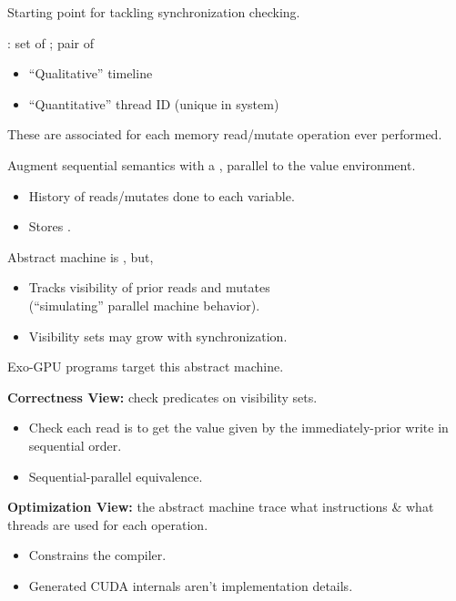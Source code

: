 \newpage
{}

{\LARGE
Starting point for tackling synchronization checking.

\vspace{5mm}

: set of ; pair of
\begin{itemize}
  \item ``Qualitative'' timeline
  \item ``Quantitative'' thread ID (unique in system)
\end{itemize}

\vspace{5mm}

These are associated for each memory read/mutate operation ever performed.

}


\newpage
{}

{\LARGE

Augment sequential semantics with a , parallel to the value environment.
\begin{itemize}
  \item History of reads/mutates done to each variable.
  \item Stores .
\end{itemize}

\vspace{5mm}

Abstract machine is , but,
\begin{itemize}
  \item Tracks visibility of prior reads and mutates\\(``simulating'' parallel machine behavior).
  \item Visibility sets may grow with synchronization.
\end{itemize}

}


\newpage
{}

{\LARGE
Exo-GPU programs target this abstract machine.

\textbf{Correctness View:} check predicates on visibility sets.
\begin{itemize}
  \item Check each read is  to get the value given by the immediately-prior write in sequential order.
  \item Sequential-parallel equivalence.
\end{itemize}

\textbf{Optimization View:} the abstract machine trace  what instructions \& what threads are used for each operation.
\begin{itemize}
  \item Constrains the compiler.
  \item Generated CUDA internals aren't implementation details.
\end{itemize}

}



